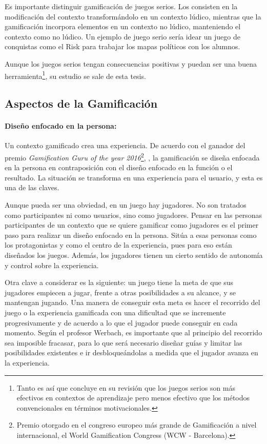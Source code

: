 Es importante distinguir gamificación de juegos serios. Los  consisten en la modificación del contexto transformándolo en un contexto lúdico, mientras que la gamificación incorpora elementos en un contexto no lúdico, manteniendo el contexto como no lúdico.
%
Un ejemplo de juego serio sería idear un juego de conquistas como el Risk para trabajar los mapas políticos con los alumnos. 

Aunque los juegos serios tengan consecuencias positivas y puedan ser una buena herramienta\footnote{Tanto es así que  \cite{MetaSerious} concluye en su revisión que los juegos serios son más efectivos en contextos de aprendizaje pero menos efectivo que los métodos convencionales en términos motivacionales.}, su estudio se sale de esta tesis.

\subsection{Aspectos de la Gamificación}

\paragraph{Diseño enfocado en la persona:} 
Un contexto gamificado crea una experiencia.
%
De acuerdo con el ganador del premio \textit{Gamification Guru of the year 2016}\footnote{Premio otorgado en el congreso europeo más grande de Gamificación a nivel internacional, el World Gamification Congress (WCW - Barcelona).},  \cite{BeyondPBL}, la gamificación se diseña enfocada en la persona en contraposición con el diseño enfocado en la función o el resultado.
%
La situación se transforma en una experiencia para el usuario, y esta es una de las claves.

Aunque pueda ser una obviedad, en un juego hay jugadores. 
%
No son tratados como participantes ni como usuarios, sino como jugadores.
%
Pensar en las personas participantes de un contexto que se quiere gamificar como jugadores es el primer paso para realizar un diseño enfocado en la persona.
%
Sitúa a esas personas como los protagonistas y como el centro de la experiencia, pues para eso están diseñados los juegos.
%
Además, los jugadores tienen un cierto sentido de autonomía y control sobre la experiencia.

Otra clave a considerar es la siguiente: un juego tiene la meta de que sus jugadores empiecen a jugar, frente a otras posibilidades a su alcance, y se mantengan jugando.
%
Una manera de conseguir esta meta es hacer el recorrido del juego o la experiencia gamificada con una dificultad que se incremente progresivamente y de acuerdo a lo que el jugador puede conseguir en cada momento. 
%
Según el profesor Werbach, es importante que al principio del recorrido sea imposible fracasar, para lo que será necesario diseñar guías y limitar las posibilidades existentes e ir desbloqueándolas a medida que el jugador avanza en la experiencia.


